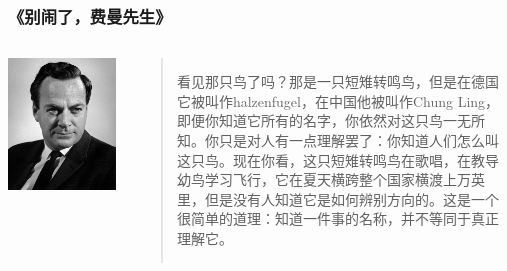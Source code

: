 \documentclass[aspectratio=169, 14pt]{beamer}
\begin{document}
\begin{frame}
	\frametitle{《别闹了，费曼先生》}
	\begin{columns}
		\includegraphics[height=0.5\paperheight]{image/feynman}
		\begin{quote}
			看见那只鸟了吗？那是一只短雉转鸣鸟，但是在德国它被叫作halzenfugel，在中国他被叫作Chung Ling，\alert{即便你知道它所有的名字，你依然对这只鸟一无所知}。你只是对人有一点理解罢了：你知道人们怎么叫这只鸟。现在你看，这只短雉转鸣鸟在歌唱，在教导幼鸟学习飞行，它在夏天横跨整个国家横渡上万英里，但是没有人知道它是如何辨别方向的。\alert{这是一个很简单的道理：知道一件事的名称，并不等同于真正理解它}。
		\end{quote}
	\end{columns}


\end{frame}
\end{document}

